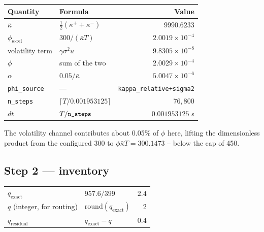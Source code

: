 \documentclass[11pt,a4paper]{article}
\newcommand{\code}[1]{\texttt{\small #1}}
\begin{document}
\begin{center}\small
\begin{tabular}{@{}llr@{}}
\toprule
\textbf{Quantity} & \textbf{Formula} & \textbf{Value} \\
\midrule
$\bar{\kappa}$ & $\tfrac12(\kappa^{+}+\kappa^{-})$ & $9990.6233$ \\
$\phi_{\kappa\text{-rel}}$ & $300/(\bar{\kappa}T)$ & $2.0019\times10^{-4}$ \\
volatility term & $\gamma\sigma^{2}u$ & $9.8305\times10^{-8}$ \\
$\phi$ & sum of the two & $2.0029\times10^{-4}$ \\
$\alpha$ & $0.05/\bar{\kappa}$ & $5.0047\times10^{-6}$ \\
\code{phi\_source} & --- & \code{kappa\_relative+sigma2} \\
\code{n\_steps} & $\lceil T/0.001953125\rceil$ & $76{,}800$ \\
$dt$ & $T/\text{\code{n\_steps}}$ & $0.001953125$ s \\
\bottomrule
\end{tabular}
\end{center}

The volatility channel contributes about 0.05\% of $\phi$ here, lifting the
dimensionless product from the configured $300$ to
$\phi\bar{\kappa}T = 300.1473$ -- below the cap of 450.

\subsection{Step 2 --- inventory}

\begin{center}\small
\begin{tabular}{@{}llr@{}}
\toprule
$q_{\text{exact}}$ & $957.6 / 399$ & $2.4$ \\
$q$ (integer, for routing) & $\text{round}(q_{\text{exact}})$ & $2$ \\
$q_{\text{residual}}$ & $q_{\text{exact}} - q$ & $0.4$ \\
\bottomrule
\end{tabular}
\end{center}
\end{document}
